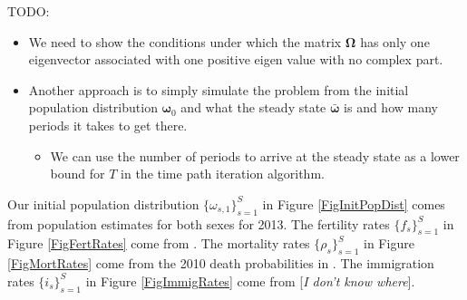 \documentclass[letterpaper,12pt]{article}
\theoremstyle{definition}
\begin{document}
  \noindent TODO:
  \begin{itemize}
    \item We need to show the conditions under which the matrix $\bm{\Omega}$ has only one eigenvector associated with one positive eigen value with no complex part.
    \item Another approach is to simply simulate the problem from the initial population distribution $\bm{\omega}_0$ and what the steady state $\bm{\bar{\omega}}$ is and how many periods it takes to get there.
      \begin{itemize}
        \item We can use the number of periods to arrive at the steady state as a lower bound for $T$ in the time path iteration algorithm.
      \end{itemize}
  \end{itemize}

  Our initial population distribution $\{\omega_{s,1}\}_{s=1}^S$ in Figure \ref{FigInitPopDist} comes from \citet{Census:2014} population estimates for both sexes for 2013. The fertility rates $\{f_s\}_{s=1}^S$ in Figure \ref{FigFertRates} come from \citet[Table 1]{NVSR:2014}. The mortality rates $\{\rho_s\}_{s=1}^S$ in Figure \ref{FigMortRates} come from the 2010 death probabilities in \citet{SocSec:2010}. The immigration rates $\{i_s\}_{s=1}^S$ in Figure \ref{FigImmigRates} come from [\textit{I don't know where}].
\end{document}
